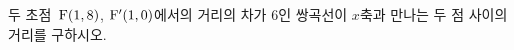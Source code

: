 두 초점~$\mathrm{F}(1{,}\mkern3mu\mathopen{}8)$, $\mathrm{F}'(1{,}\mkern3mu\mathopen{}0)$에서의 거리의 차가 $6$인 쌍곡선이 \mbox{$x$축과} 만나는 두 점 사이의 거리를 구하시오.
